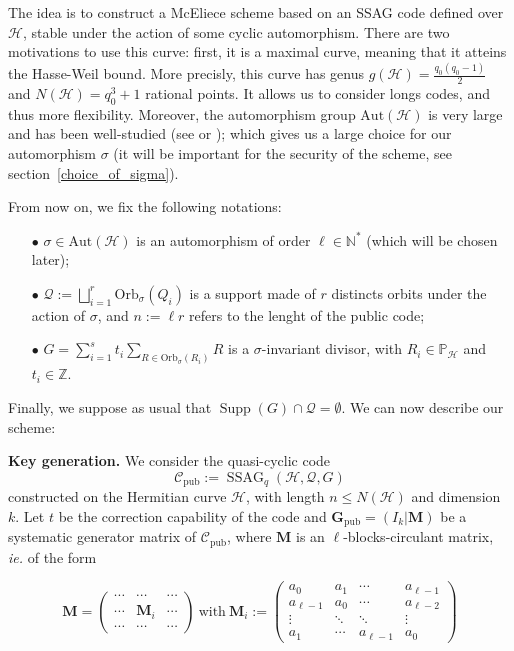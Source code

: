 \documentclass[10pt]{article}
\theoremstyle{definition}
\theoremstyle{definition}
\theoremstyle{definition}
\newcommand{\N}{\mathbb{N}}
\newcommand{\Z}{\mathbb{Z}}
\newcommand{\PP}{\mathbb{P}}
\newcommand{\calH}{\mathcal{H}}
\newcommand{\QR}{\mathcal{Q}}
\newcommand{\Supp}{\operatorname{Supp}}
\newcommand{\ssag}{\operatorname{SSAG}}
\begin{document}
The idea is to construct a McEliece scheme based on an SSAG code defined over $\calH$, stable under the action of some cyclic automorphism. There are two motivations to use this curve: first, it is a maximal curve,  meaning that it atteins the Hasse-Weil bound. More precisly, this curve has genus $g(\calH)= \frac{q_0(q_0-1)}{2}$ and $N(\calH)=q_0^3+1$ rational points. It allows us to consider longs codes, and thus more flexibility. Moreover, the automorphism group $\mathrm{Aut}(\mathcal{H})$ is very large and has been well-studied (see \cite{Sti} or \cite{Gar}); which gives us a large choice for our automorphism $\sigma$ (it will be important for the security of the scheme, see section~\ref{choice_of_sigma}). 



 From now on, we fix the following notations: 
\begin{enumerate}
\item[$\bullet$] $\sigma \in \mathrm{Aut}(\calH)$ is an automorphism of order $\ell \in \N^*$ (which will be chosen later);
\item[$\bullet$] $\QR := \bigsqcup\limits_{i=1}^{r} \mathrm{Orb}_{\sigma}(Q_i)$ is a support made of $r$ distincts orbits under the action of $\sigma$, and $n:=\ell r$ refers to the lenght of the public code;
\item[$\bullet$] $G = \sum\limits_{i=1}^s t_i \sum\limits_{R \in \mathrm{Orb}_{\sigma}(R_i)} R$ is a $\sigma$-invariant divisor, with $R_i \in \PP_{\mathcal{H}}$ and $t_i \in \Z$. 
\end{enumerate}

Finally, we suppose as usual that $\Supp(G)\cap \QR = \emptyset$. We can now describe our scheme: 



 \textbf{Key generation.} We consider the quasi-cyclic code 
\[\mathcal{C}_{\mathrm{pub}} := \ssag_q(\mathcal{H},\QR,G)\]
constructed on the Hermitian curve $\mathcal{H}$, with length $n \leq N(\mathcal{H})$ and dimension $k$. Let $t$ be the correction capability of the code and $\mathbf{G}_{\mathrm{pub}} = (I_k | \mathbf{M})$ be a systematic generator matrix of $\mathcal{C}_{\mathrm{pub}}$, where $\mathbf{M}$ is an $\ell$-blocks-circulant matrix, \textit{ie.} of the form 

\begin{equation*}
\mathbf{M}= \begin{pmatrix}
\cdots & \cdots & \cdots \\
\cdots & \mathbf{M}_i & \cdots \\
\cdots & \cdots & \cdots
\end{pmatrix}
\ \mathrm{with} \ \mathbf{M}_i := \begin{pmatrix}
a_0 & a_1 & \cdots & a_{\ell-1} \\
a_{\ell-1} & a_0 & \cdots & a_{\ell-2} \\
\vdots & \ddots & \ddots & \vdots \\
a_1 & \cdots & a_{\ell-1} & a_0 
\end{pmatrix}
\end{equation*}
\end{document}
